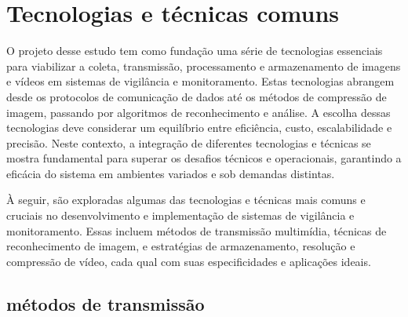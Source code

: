 \documentclass[12pt, %
openright, 
oneside, %
a4paper,    %
brazil]{facom-ufu-abntex2}
\begin{document}
\section{Tecnologias e técnicas comuns}

O projeto desse estudo tem como fundação uma série de tecnologias essenciais
para viabilizar a coleta, transmissão, processamento e armazenamento de imagens
e vídeos em sistemas de vigilância e monitoramento. Estas tecnologias abrangem
desde os protocolos de comunicação de dados até os métodos de compressão de
imagem, passando por algoritmos de reconhecimento e análise. A escolha dessas
tecnologias deve considerar um equilíbrio entre eficiência, custo,
escalabilidade e precisão. Neste contexto, a integração de diferentes
tecnologias e técnicas se mostra fundamental para superar os desafios técnicos
e operacionais, garantindo a eficácia do sistema em ambientes variados e sob
demandas distintas.

À seguir, são exploradas algumas das tecnologias e técnicas mais comuns e
cruciais no desenvolvimento e implementação de sistemas de vigilância e
monitoramento. Essas incluem métodos de transmissão multimídia, técnicas de
reconhecimento de imagem, e estratégias de armazenamento, resolução e
compressão de vídeo, cada qual com suas especificidades e aplicações ideais.

\subsection{métodos de transmissão}
\end{document}
